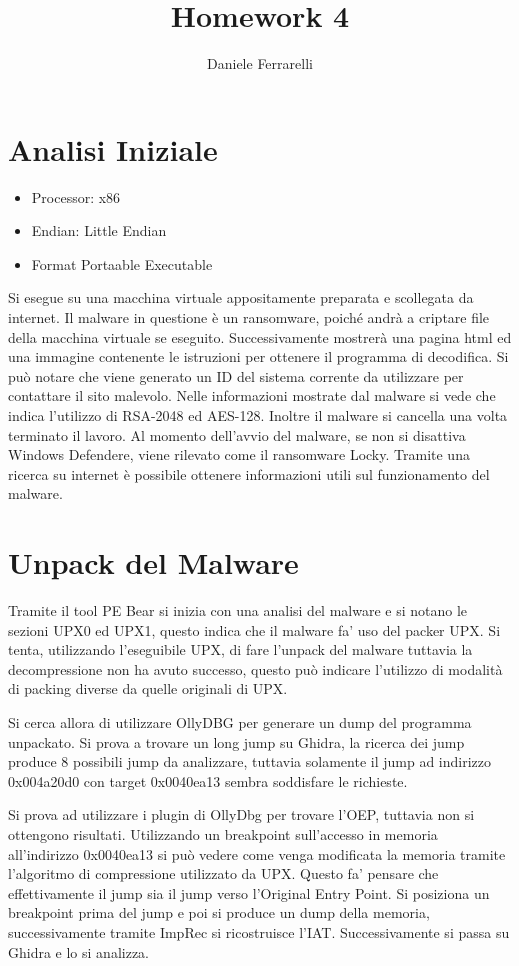 \documentclass[]{article}
\title{Homework 4}
\author{Daniele Ferrarelli}
\date{}
\begin{document}
\maketitle
\section{Analisi Iniziale}
\begin{itemize}
	\item Processor: x86
	\item Endian: Little Endian
	\item Format Portaable Executable
\end{itemize}


Si esegue su una macchina virtuale appositamente preparata e scollegata  da internet. Il malware in questione è un ransomware, poiché andrà a criptare file della macchina virtuale se eseguito. Successivamente mostrerà una pagina html ed una immagine contenente le istruzioni per ottenere il programma di decodifica. Si può notare che viene generato un ID del sistema corrente da utilizzare per contattare il sito malevolo. Nelle informazioni mostrate dal malware si vede che indica l'utilizzo di RSA-2048 ed AES-128.  Inoltre il malware si cancella una volta terminato il lavoro. Al momento dell'avvio del malware, se non si disattiva Windows Defendere, viene rilevato come il ransomware Locky. Tramite una ricerca su internet è possibile ottenere informazioni utili sul funzionamento del malware. 

\section{Unpack del Malware}
Tramite il tool PE Bear si inizia con una analisi del malware e si notano le sezioni UPX0 ed UPX1, questo indica che il malware fa' uso del packer UPX. Si tenta, utilizzando l'eseguibile UPX, di fare l'unpack del malware tuttavia la decompressione non ha avuto successo, questo può indicare l'utilizzo di modalità di packing diverse da quelle originali di UPX.

Si cerca allora di utilizzare OllyDBG per generare un dump del programma unpackato. Si prova a trovare un long jump su Ghidra, la ricerca dei jump produce 8 possibili jump da analizzare, tuttavia solamente il jump ad indirizzo 0x004a20d0 con target 0x0040ea13 sembra soddisfare le richieste. 

Si prova ad utilizzare i plugin di OllyDbg per trovare l'OEP, tuttavia non si ottengono risultati.
Utilizzando un breakpoint sull'accesso in memoria all'indirizzo 0x0040ea13 si può vedere come venga modificata la memoria tramite l'algoritmo di compressione utilizzato da UPX. Questo fa' pensare che effettivamente il jump sia il jump verso l'Original Entry Point. Si posiziona un breakpoint prima del jump e poi si produce un dump della memoria, successivamente tramite ImpRec si ricostruisce l'IAT.
Successivamente si passa su Ghidra e lo si analizza.
\end{document}
